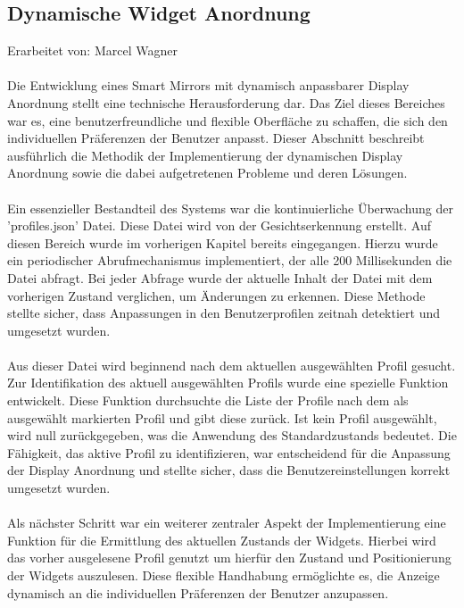 \subsection{Dynamische Widget Anordnung}
Erarbeitet von: Marcel Wagner \\ \\
Die Entwicklung eines Smart Mirrors mit dynamisch anpassbarer Display Anordnung stellt eine technische Herausforderung dar. Das Ziel dieses Bereiches war es, eine benutzerfreundliche und flexible Oberfläche zu schaffen, die sich den individuellen Präferenzen der Benutzer anpasst. Dieser Abschnitt beschreibt ausführlich die Methodik der Implementierung der dynamischen Display Anordnung sowie die dabei aufgetretenen Probleme und deren Lösungen. \\ \\
Ein essenzieller Bestandteil des Systems war die kontinuierliche Überwachung der 'profiles.json' Datei. Diese Datei wird von der Gesichtserkennung erstellt. Auf diesen Bereich wurde im vorherigen Kapitel bereits eingegangen. Hierzu wurde ein periodischer Abrufmechanismus implementiert, der alle 200 Millisekunden die Datei abfragt. Bei jeder Abfrage wurde der aktuelle Inhalt der Datei mit dem vorherigen Zustand verglichen, um Änderungen zu erkennen. Diese Methode stellte sicher, dass Anpassungen in den Benutzerprofilen zeitnah detektiert und umgesetzt wurden. \\ \\
Aus dieser Datei wird beginnend nach dem aktuellen ausgewählten Profil gesucht. Zur Identifikation des aktuell ausgewählten Profils wurde eine spezielle Funktion entwickelt. Diese Funktion durchsuchte die Liste der Profile nach dem als ausgewählt markierten Profil und gibt diese zurück. Ist kein Profil ausgewählt, wird null zurückgegeben, was die Anwendung des Standardzustands bedeutet. Die Fähigkeit, das aktive Profil zu identifizieren, war entscheidend für die Anpassung der Display Anordnung und stellte sicher, dass die Benutzereinstellungen korrekt umgesetzt wurden. \\ \\
Als nächster Schritt war ein weiterer zentraler Aspekt der Implementierung eine Funktion für die Ermittlung des aktuellen Zustands der Widgets. Hierbei wird das vorher ausgelesene Profil genutzt um hierfür den Zustand und Positionierung der Widgets auszulesen. Diese flexible Handhabung ermöglichte es, die Anzeige dynamisch an die individuellen Präferenzen der Benutzer anzupassen. \\ \\
